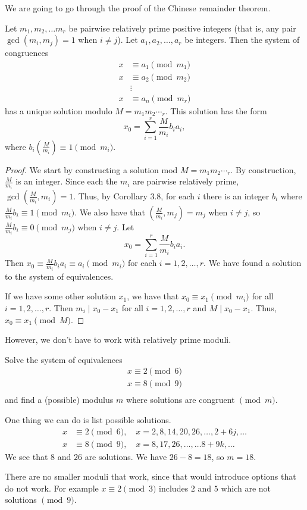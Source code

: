 \documentclass[letterpaper, 11 pt]{article}
\begin{document}
We are going to go through the proof of the Chinese remainder theorem. 
\begin{thm}
 Let $m_1,m_2,\dots m_r$ be pairwise relatively prime positive integers (that is, any pair $\gcd(m_i,m_j)=1$ when $i\neq j$). Let $a_1, a_2,\dots, a_r$ be integers. Then the system of congruences 
\begin{align*}
 x&\equiv a_1 \pmod{m_1}\\
 x&\equiv a_2 \pmod{m_2}\\
    &\vdots\\
  x&\equiv a_n \pmod{m_r}
\end{align*}
has a unique solution modulo $M=m_1m_2\dotsm_r$. This solution has the form 
\[x_0=\sum_{i=1}^r \frac{M}{m_i}b_ia_i,\] where $b_i(\frac{M}{m_i})\equiv 1 \pmod{m_i}$.
\end{thm}
\begin{proof}
 We start by constructing a solution mod $M=m_1m_2\dotsm_r$. By construction, $\frac{M}{m_i}$ is an integer. Since each the $m_i$ are pairwise relatively prime, $\gcd(\frac{M}{m_i}, m_i)=1$. Thus, by Corollary 3.8, for each $i$ there is an integer $b_i$ where $\frac{M}{m_i}b_i\equiv 1 \pmod{m_i}$. We also have that $(\frac{M}{m_i}, m_j)=m_j$ when $i\neq j$, so $\frac{M}{m_i}b_i\equiv 0 \pmod{m_j}$ when $i\neq j$.  Let 
 \[x_0=\sum_{i=1}^r \frac{M}{m_i}b_ia_i.\] 
 Then $x_0\equiv \frac{M}{m_i}b_ia_i\equiv a_i\pmod{m_i}$ for each $i=1,2,\dots,r$. We have found a solution to the system of equivalences.
 
 If we have some other solution $x_1$, we have that $x_0\equiv x_1\pmod{m_i}$ for all $i=1,2,\dots, r$. Then $m_i\mid x_0- x_1$ for all $i=1,2,\dots,r$ and $M\mid x_0-x_1$. Thus, $x_0\equiv x_1\pmod{M}$.
\end{proof}


However, we don't have to work with relatively prime moduli.

\begin{example}
 Solve the system of equivalences
\begin{align*}
 x\equiv 2 \pmod 6\\
 x\equiv 8 \pmod 9\\
\end{align*}
and find a (possible) modulus $m$ where solutions are congruent $\pmod m$.
\end{example}
\begin{solution}
One thing we can do is list possible solutions.
\begin{align*}
 x&\equiv 2 \pmod 6, \quad x=2,8,14,20, 26, \dots, 2+6j,\dots\\
 x&\equiv 8 \pmod 9, \quad x=8,17, 26,\dots,\dots 8+9k,\dots
\end{align*}
We see that $8$ and $26$ are solutions. We have $26-8=18$, so $m=18$. 

There are no smaller moduli that work, since that would introduce options that do not work. For example $x\equiv 2 \pmod 3$ includes $2$ and $5$ which are not solutions $\pmod 9$.
\end{solution}
\end{document}

